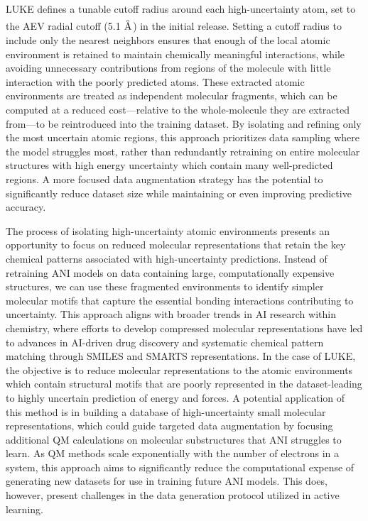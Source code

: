 LUKE defines a tunable cutoff radius around each high-uncertainty atom, set to the AEV radial cutoff (5.1 $\angstrom$) in the initial release. 
Setting a cutoff radius to include only the nearest neighbors ensures that enough of the local atomic environment is retained to maintain chemically meaningful interactions, while avoiding unnecessary contributions from regions of the molecule with little interaction with the poorly predicted atoms. 
These extracted atomic environments are treated as independent molecular fragments, which can be computed at a reduced cost---relative to the whole-molecule they are extracted from---to be reintroduced into the training dataset.
By isolating and refining only the most uncertain atomic regions, this approach prioritizes data sampling where the model struggles most, rather than redundantly retraining on entire molecular structures with high energy uncertainty which contain many well-predicted regions.
A more focused data augmentation strategy has the potential to significantly reduce dataset size while maintaining or even improving predictive accuracy.

The process of isolating high-uncertainty atomic environments presents an opportunity to focus on reduced molecular representations that retain the key chemical patterns associated with high-uncertainty predictions. 
Instead of retraining ANI models on data containing large, computationally expensive structures, we can use these fragmented environments to identify simpler molecular motifs that capture the essential bonding interactions contributing to uncertainty. 
This approach aligns with broader trends in AI research within chemistry, where efforts to develop compressed molecular representations have led to advances in AI-driven drug discovery \cite{mol_reps_in_AI_drug_discovery_david} and systematic chemical pattern matching \cite{SMILES_pair_encoding_li, mol_patterns_SMARTS_schmidt, automated_fragment_gen_smiles_bilsland} through SMILES \cite{smiles} and SMARTS \cite{smarts} representations.
In the case of LUKE, the objective is to reduce molecular representations to the atomic environments which contain structural motifs that are poorly represented in the dataset-leading to highly uncertain prediction of energy and forces. 
A potential application of this method is in building a database of high-uncertainty small molecular representations, which could guide targeted data augmentation by focusing additional QM calculations on molecular substructures that ANI struggles to learn. 
As QM methods scale exponentially with the number of electrons in a system, this approach aims to significantly reduce the computational expense of generating new datasets for use in training future ANI models.
This does, however, present challenges in the data generation protocol utilized in active learning.

